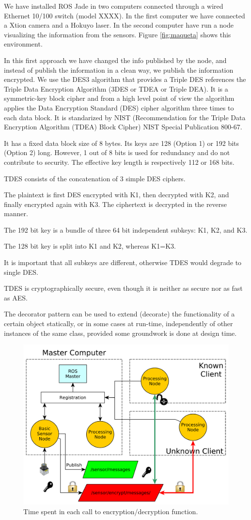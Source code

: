 \documentclass[journal,twoside]{JoPhA}
\begin{document}
We have installed ROS Jade in two computers connected through a wired Ethernet 10/100 switch (model XXXX). In the first computer we have connected a Xtion camera and a Hokuyo laser. In the second computer have run a node visualizing the information from the sensors. Figure \ref{fig:maqueta} shows this environment.



In this first approach we have changed the info published by the node, and instead of publish the information in a clean way, we publish the information encrypted.
We use the DES3 algorithm that provides a 
Triple DES references the Triple Data Encryption Algorithm (3DES or TDEA or Triple DEA). It is a symmetric-key block cipher and from a high level point of view the algorithm applies the Data Encryption Standard (DES) cipher algorithm three times to each data block. It is standarized by NIST (Recommendation for
the Triple Data Encryption Algorithm (TDEA) Block Cipher) NIST Special Publication 800-67.

It has a fixed data block size of 8 bytes. Its keys are 128 (Option 1) or 192 bits (Option 2) long. However, 1 out of 8 bits is used for redundancy and do not contribute to security. The effective key length is respectively 112 or 168 bits.

TDES consists of the concatenation of 3 simple DES ciphers.

The plaintext is first DES encrypted with K1, then decrypted with K2, and finally encrypted again with K3. The ciphertext is decrypted in the reverse manner.

The 192 bit key is a bundle of three 64 bit independent subkeys: K1, K2, and K3.

The 128 bit key is split into K1 and K2, whereas K1=K3.

It is important that all subkeys are different, otherwise TDES would degrade to single DES.

TDES is cryptographically secure, even though it is neither as secure nor as fast as AES.


The decorator pattern can be used to extend (decorate) the functionality of a certain object statically, or in some cases at run-time, independently of other instances of the same class, provided some groundwork is done at design time. 

\begin{figure}[ht]
    \centering
    \includegraphics[width=.5\textwidth]{TestBed.pdf}
    \caption{Time spent in each call to encryption/decryption function.}
  \label{fig:TestBed}
\end{figure}
\end{document}
